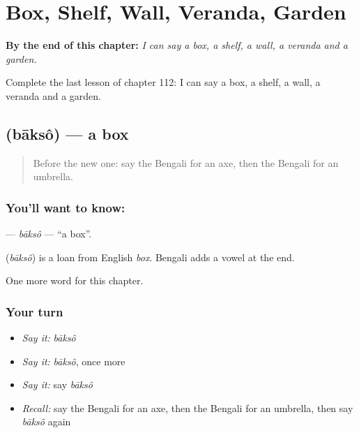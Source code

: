
\chapter{Box, Shelf, Wall, Veranda, Garden}
\label{ch:bn-box-shelf-wall-veranda-garden}

\begin{chapteropening}
\textbf{By the end of this chapter:} \emph{I can say a box, a shelf, a wall, a veranda and a garden.}

Complete the last lesson of chapter 112: I can say a box, a shelf, a wall, a veranda and a garden.
\end{chapteropening}

\section[\texorpdfstring{\bn{বাক্স} (bāksô)}{বাক্স (bāksô)}]{ (bāksô) — a box}

\label{lesson:BN-C112-bakso}



\begin{quote}
Before the new one: say the Bengali for an axe, then the Bengali for an umbrella.
\end{quote}

\subsection*{You'll want to know: }
\textbf{} — \emph{bāksô} — \textquotedblleft{}a box\textquotedblright{}.

\begin{cousinweb}
\textbf{} (\emph{bāksô}) is a loan from English \emph{box}. Bengali adds a vowel at the end.
\end{cousinweb}

\begin{grammarlens}[title={What you've built}]
One more word for this chapter.
\end{grammarlens}

\subsection*{Your turn}
\begin{itemize}
\raggedright
  \item \emph{Say it:} \emph{bāksô}
  \item \emph{Say it:} \emph{bāksô}, once more
  \item \emph{Say it:} say \emph{bāksô}
  \item \emph{Recall:} say the Bengali for an axe, then the Bengali for an umbrella, then say \emph{bāksô} again
\end{itemize}

